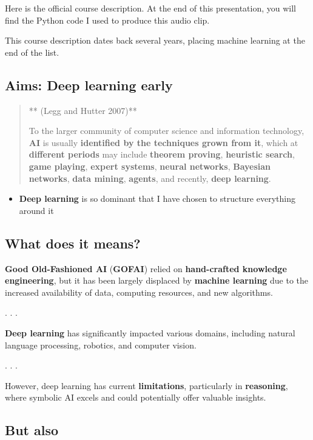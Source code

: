 \documentclass[
  letterpaper,
  DIV=11,
  numbers=noendperiod]{scrartcl}
\providecommand{\tightlist}{%
  \setlength{\itemsep}{0pt}\setlength{\parskip}{0pt}}
\begin{document}
Here is the official course description. At the end of this
presentation, you will find the Python code I used to produce this audio
clip.

This course description dates back several years, placing machine
learning at the end of the list.

\subsection{Aims: Deep learning early}\label{aims-deep-learning-early}

\begin{quote}
** (Legg and Hutter 2007)**

To the larger community of computer science and information technology,
\textbf{AI} is usually \textbf{identified by the techniques grown from
it}, which at \textbf{different periods} may include \textbf{theorem
proving}, \textbf{heuristic search}, \textbf{game playing},
\textbf{expert systems}, \textbf{neural networks}, \textbf{Bayesian
networks}, \textbf{data mining}, \textbf{agents}, and recently,
\textbf{deep learning}.
\end{quote}

\begin{itemize}
\tightlist
\item
  \textbf{Deep learning} is so dominant that I have chosen to structure
  everything around it
\end{itemize}

\subsection{What does it means?}\label{what-does-it-means}

\textbf{Good Old-Fashioned AI} (\textbf{GOFAI}) relied on
\textbf{hand-crafted knowledge engineering}, but it has been largely
displaced by \textbf{machine learning} due to the increased availability
of data, computing resources, and new algorithms.

. . .

\textbf{Deep learning} has significantly impacted various domains,
including natural language processing, robotics, and computer vision.

. . .

However, deep learning has current \textbf{limitations}, particularly in
\textbf{reasoning}, where symbolic AI excels and could potentially offer
valuable insights.

\subsection{But also}\label{but-also}
\end{document}
